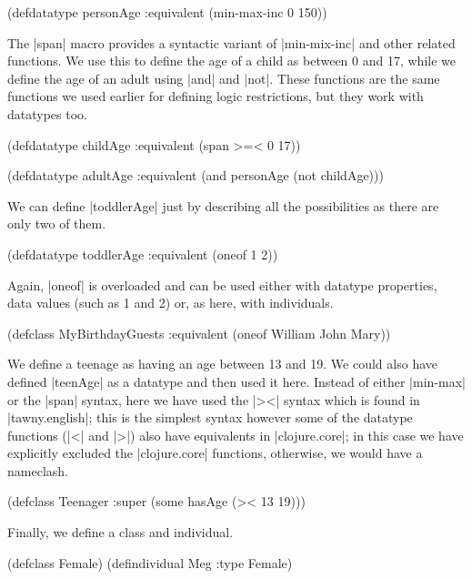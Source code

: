 \begin{tawny}
(defdatatype personAge
  :equivalent (min-max-inc 0 150))
\end{tawny}

The |span| macro provides a syntactic variant of |min-mix-inc| and other
related functions. We use this to define the age of a child as between
0 and 17, while we define the age of an adult using |and| and
|not|. These functions are the same functions we used earlier for
defining logic restrictions, but they work with datatypes too.

\begin{tawny}
(defdatatype childAge
  :equivalent (span >=< 0 17))

(defdatatype adultAge
  :equivalent (and personAge (not childAge)))
\end{tawny}

We can define |toddlerAge| just by describing all the possibilities as
there are only two of them.

\begin{tawny}
(defdatatype toddlerAge
  :equivalent (oneof 1 2))
\end{tawny}

Again, |oneof| is overloaded and can be used either with datatype
properties, data values (such as 1 and 2) or, as here, with
individuals.

\begin{tawny}
(defclass MyBirthdayGuests
  :equivalent (oneof William John Mary))
\end{tawny}

We define a teenage as having an age between 13 and 19. We could also have
defined |teenAge| as a datatype and then used it here. Instead of either
|min-max| or the |span| syntax, here we have used the |><| syntax which is
found in |tawny.english|; this is the simplest syntax however some
of the datatype functions (|<| and |>|) also have equivalents in
|clojure.core|; in this case we have explicitly excluded the
|clojure.core| functions, otherwise, we would have a nameclash.

\begin{tawny}
(defclass Teenager
  :super (some hasAge (>< 13 19)))
\end{tawny}

Finally, we define a class and individual.

\begin{tawny}
(defclass Female)
(defindividual Meg :type Female)
\end{tawny}


